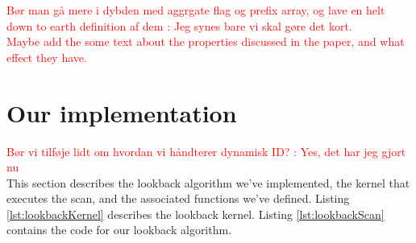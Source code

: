 \documentclass[twocolumn]{article}
\newcommand{\note}[1]{\textcolor{red}{#1}\\}
\begin{document}
\note{Bør man gå mere i dybden med aggrgate flag og prefix array, og lave en helt down to earth definition af dem : Jeg synes bare vi skal gøre det kort.}

\note{Maybe add the some text about the properties discussed in the paper, and what effect they have.}

\section{Our implementation}
\note{Bør vi tilføje lidt om hvordan vi håndterer dynamisk ID? : Yes, det har jeg gjort nu}
\label{Sec:Implementation}
This section describes the lookback algorithm we've implemented, the kernel that executes the scan, and the associated functions we've defined. Listing \ref{lst:lookbackKernel} describes the lookback kernel. Listing \ref{lst:lookbackScan} contains the code for our lookback algorithm.
\end{document}
